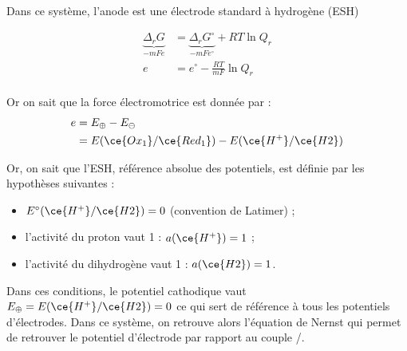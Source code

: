Dans ce système, l'anode est une électrode standard à hydrogène (ESH)

\begin{align}
\underbrace{\Delta_r G}_{-m F e} & = \underbrace{\Delta_r G^\circ}_{-m F e^\circ} + RT \ln Q_r \\
e &= e^\circ - \frac{RT}{mF} \ln Q_r \\
\end{align}

Or on sait que la force électromotrice est donnée par : 
\begin{align}
e &= E_\oplus - E_\ominus \\
&= E ( \ce{Ox_1} / \ce{Red_1} ) - E ( \ce{H^+} / \ce{H2} )
\end{align}

Or, on sait que l'ESH, référence absolue des potentiels, est définie par les hypothèses suivantes :
\begin{itemize}
\item $E^\circ ( \ce{H^+} / \ce{H2} ) = 0 $ (convention de Latimer) ;
\item l'activité du proton vaut 1 : $a (\ce{H^+}) = 1$ ;
\item l'activité du dihydrogène vaut 1 : $a (\ce{H2}) = 1$.
\end{itemize}

Dans ces conditions, le potentiel cathodique vaut $E_\oplus = E ( \ce{H^+} / \ce{H2} ) = 0 $ ce qui sert de référence à tous les potentiels d'électrodes. Dans ce système, on retrouve alors l'équation de Nernst qui permet de retrouver le potentiel d'électrode par rapport au couple /.




